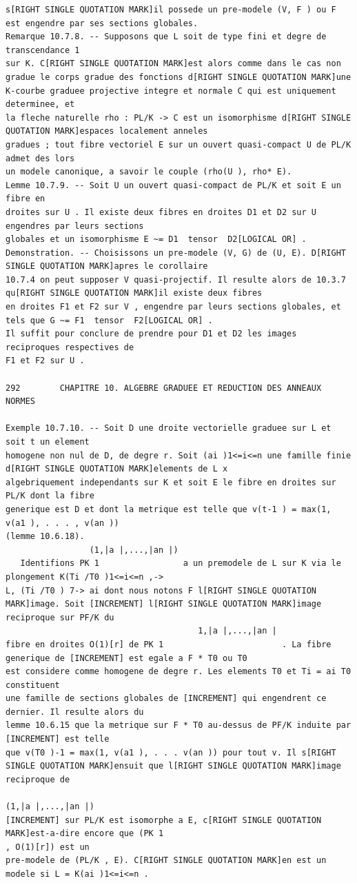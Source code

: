 \documentclass[
  11pt,
]{article}
\begin{document}
\begin{lstlisting}
s[RIGHT SINGLE QUOTATION MARK]il possede un pre-modele (V, F ) ou F est engendre par ses sections globales.
Remarque 10.7.8. -- Supposons que L soit de type fini et degre de transcendance 1
sur K. C[RIGHT SINGLE QUOTATION MARK]est alors comme dans le cas non gradue le corps gradue des fonctions d[RIGHT SINGLE QUOTATION MARK]une
K-courbe graduee projective integre et normale C qui est uniquement determinee, et
la fleche naturelle rho : PL/K -> C est un isomorphisme d[RIGHT SINGLE QUOTATION MARK]espaces localement anneles
gradues ; tout fibre vectoriel E sur un ouvert quasi-compact U de PL/K admet des lors
un modele canonique, a savoir le couple (rho(U ), rho* E).
Lemme 10.7.9. -- Soit U un ouvert quasi-compact de PL/K et soit E un fibre en
droites sur U . Il existe deux fibres en droites D1 et D2 sur U engendres par leurs sections
globales et un isomorphisme E ~= D1  tensor  D2[LOGICAL OR] .
Demonstration. -- Choisissons un pre-modele (V, G) de (U, E). D[RIGHT SINGLE QUOTATION MARK]apres le corollaire
10.7.4 on peut supposer V quasi-projectif. Il resulte alors de 10.3.7 qu[RIGHT SINGLE QUOTATION MARK]il existe deux fibres
en droites F1 et F2 sur V , engendre par leurs sections globales, et tels que G ~= F1  tensor  F2[LOGICAL OR] .
Il suffit pour conclure de prendre pour D1 et D2 les images reciproques respectives de
F1 et F2 sur U .

292        CHAPITRE 10. ALGEBRE GRADUEE ET REDUCTION DES ANNEAUX NORMES

Exemple 10.7.10. -- Soit D une droite vectorielle graduee sur L et soit t un element
homogene non nul de D, de degre r. Soit (ai )1<=i<=n une famille finie d[RIGHT SINGLE QUOTATION MARK]elements de L x 
algebriquement independants sur K et soit E le fibre en droites sur PL/K dont la fibre
generique est D et dont la metrique est telle que v(t-1 ) = max(1, v(a1 ), . . . , v(an ))
(lemme 10.6.18).
                 (1,|a |,...,|an |)
   Identifions PK 1                 a un premodele de L sur K via le plongement K(Ti /T0 )1<=i<=n ,->
L, (Ti /T0 ) 7-> ai dont nous notons F l[RIGHT SINGLE QUOTATION MARK]image. Soit [INCREMENT] l[RIGHT SINGLE QUOTATION MARK]image reciproque sur PF/K du
                                       1,|a |,...,|an |
fibre en droites O(1)[r] de PK 1                        . La fibre generique de [INCREMENT] est egale a F * T0 ou T0
est considere comme homogene de degre r. Les elements T0 et Ti = ai T0 constituent
une famille de sections globales de [INCREMENT] qui engendrent ce dernier. Il resulte alors du
lemme 10.6.15 que la metrique sur F * T0 au-dessus de PF/K induite par [INCREMENT] est telle
que v(T0 )-1 = max(1, v(a1 ), . . . v(an )) pour tout v. Il s[RIGHT SINGLE QUOTATION MARK]ensuit que l[RIGHT SINGLE QUOTATION MARK]image reciproque de
                                                                               (1,|a |,...,|an |)
[INCREMENT] sur PL/K est isomorphe a E, c[RIGHT SINGLE QUOTATION MARK]est-a-dire encore que (PK 1                                       , O(1)[r]) est un
pre-modele de (PL/K , E). C[RIGHT SINGLE QUOTATION MARK]en est un modele si L = K(ai )1<=i<=n .


\end{lstlisting}
\end{document}
